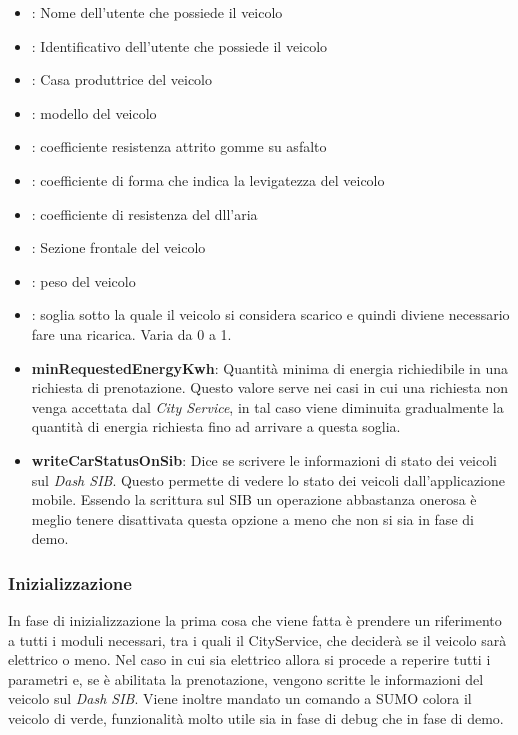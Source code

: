 \begin{itemize}
	\item {}: Nome dell'utente che possiede il veicolo
	\item {}: Identificativo dell'utente che possiede il veicolo
	\item {}: Casa produttrice del veicolo
	\item {}: modello del veicolo
	\item {}: coefficiente resistenza attrito gomme su asfalto
	\item {}: coefficiente di forma che indica la levigatezza del veicolo
	\item {}: coefficiente di resistenza del dll'aria
	\item {}: Sezione frontale del veicolo
	\item {}: peso del veicolo
	\item {}: soglia sotto la quale il veicolo si considera scarico e quindi diviene necessario fare una ricarica. Varia da 0 a 1.
	\item \textbf{minRequestedEnergyKwh}: Quantità minima di energia richiedibile in una richiesta di prenotazione. Questo valore serve nei casi in cui una richiesta non venga accettata dal \emph{City Service}, in tal caso viene diminuita gradualmente la quantità di energia richiesta fino ad arrivare a questa soglia.
	\item \textbf{writeCarStatusOnSib}: Dice se scrivere le informazioni di stato dei veicoli sul \emph{Dash SIB}. Questo permette di vedere lo stato dei veicoli dall'applicazione mobile. Essendo la scrittura sul SIB un operazione abbastanza onerosa è meglio tenere disattivata questa opzione a meno che non si sia in fase di demo.
\end{itemize}


\subsubsection{Inizializzazione}

In fase di inizializzazione la prima cosa che viene fatta è prendere un riferimento a tutti i moduli necessari, tra i quali il CityService, che  deciderà se il veicolo sarà elettrico o meno. Nel caso in cui sia elettrico allora si procede a reperire tutti i parametri e, se è abilitata la prenotazione, vengono scritte le informazioni del veicolo sul \emph{Dash SIB}. Viene inoltre mandato un comando a SUMO colora il veicolo di verde, funzionalità molto utile sia in fase di debug che in fase di demo.

